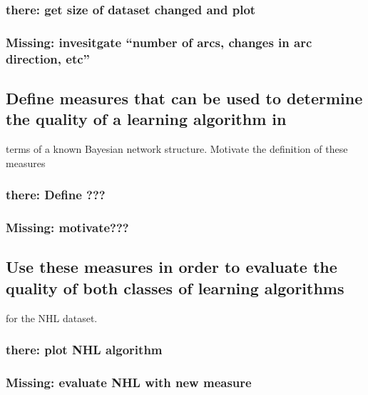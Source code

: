 \documentclass[]{article}
\begin{document}
\subsubsection{there: get size of dataset changed and
plot}\label{there-get-size-of-dataset-changed-and-plot}

\subsubsection{Missing: invesitgate ``number of arcs, changes in arc
direction,
etc''}\label{missing-invesitgate-number-of-arcs-changes-in-arc-direction-etc}

\subsection{Define measures that can be used to determine the quality of
a learning algorithm
in}\label{define-measures-that-can-be-used-to-determine-the-quality-of-a-learning-algorithm-in}

terms of a known Bayesian network structure. Motivate the definition of
these measures

\subsubsection{there: Define ???}\label{there-define}

\subsubsection{Missing: motivate???}\label{missing-motivate}

\subsection{Use these measures in order to evaluate the quality of both
classes of learning
algorithms}\label{use-these-measures-in-order-to-evaluate-the-quality-of-both-classes-of-learning-algorithms}

for the NHL dataset.

\subsubsection{there: plot NHL
algorithm}\label{there-plot-nhl-algorithm}

\subsubsection{Missing: evaluate NHL with new
measure}\label{missing-evaluate-nhl-with-new-measure}
\end{document}

